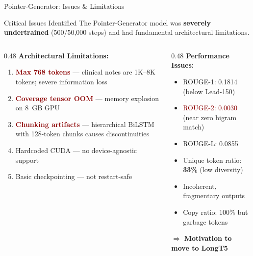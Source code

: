 \documentclass[10pt, aspectratio=169]{beamer}
\begin{document}
\begin{frame}{Pointer-Generator: Issues \& Limitations}
  \begin{alertblock}{Critical Issues Identified}
    The Pointer-Generator model was \textbf{severely undertrained} (500/50,000 steps) and had fundamental architectural limitations.
  \end{alertblock}

  \vspace{0.2cm}

  \begin{columns}[T]
    \begin{column}{0.48\textwidth}
      \textbf{Architectural Limitations:}
      \begin{enumerate}
        \item \textcolor{darkred}{\textbf{Max 768 tokens}} --- clinical notes are 1K--8K tokens; severe information loss
        \item \textcolor{darkred}{\textbf{Coverage tensor OOM}} --- memory explosion on 8~GB GPU
        \item \textcolor{darkred}{\textbf{Chunking artifacts}} --- hierarchical BiLSTM with 128-token chunks causes discontinuities
        \item Hardcoded CUDA --- no device-agnostic support
        \item Basic checkpointing --- not restart-safe
      \end{enumerate}
    \end{column}
    \begin{column}{0.48\textwidth}
      \textbf{Performance Issues:}
      \begin{itemize}
        \item ROUGE-1: 0.1814 (below Lead-150)
        \item \textcolor{darkred}{ROUGE-2: 0.0030} (near zero bigram match)
        \item ROUGE-L: 0.0855
        \item Unique token ratio: \textbf{33\%} (low diversity)
        \item Incoherent, fragmentary outputs
        \item Copy ratio: 100\% but garbage tokens
      \end{itemize}

      \vspace{0.2cm}
      $\Rightarrow$ \textbf{Motivation to move to LongT5}
    \end{column}
  \end{columns}
\end{frame}
\end{document}
